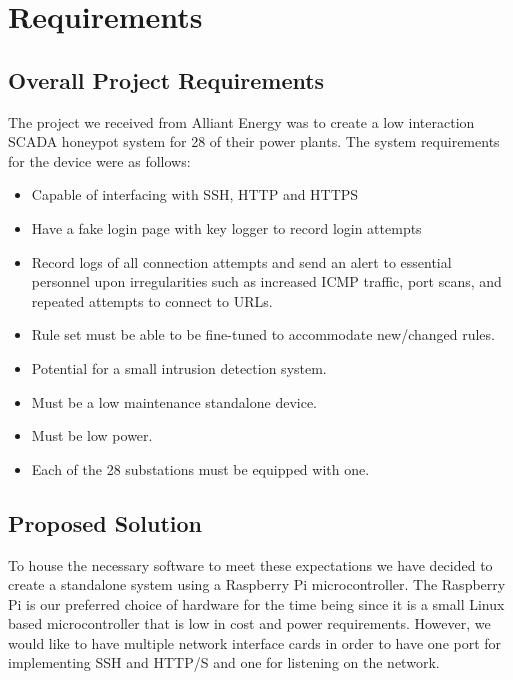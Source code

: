 \chapter{Requirements}

\section{Overall Project Requirements}

The project we received from Alliant Energy was to create a low interaction SCADA honeypot system for 28 of their power plants.  The system requirements for the device were as follows:

\begin{itemize}
    \item Capable of interfacing with SSH, HTTP and HTTPS
    \item Have a fake login page with key logger to record login attempts 
    \item Record logs of all connection attempts and send an alert to essential personnel upon irregularities such as increased ICMP traffic, port scans, and repeated attempts to connect to URLs.
    \item Rule set must be able to be fine-tuned to accommodate new/changed rules.
    \item Potential for a small intrusion detection system.
    \item Must be a low maintenance standalone device.
    \item Must be low power.
    \item Each of the 28 substations must be equipped with one.
\end{itemize}


\section{Proposed Solution}

To house the necessary software to meet these expectations we have decided to create a standalone system using a Raspberry Pi
microcontroller.  The Raspberry Pi is our preferred choice of hardware for the time being since it is a small Linux based
microcontroller that is low in cost and power requirements.  However, we would like to have multiple network interface cards in
order to have one port for implementing SSH and HTTP/S and one for listening on the network.

